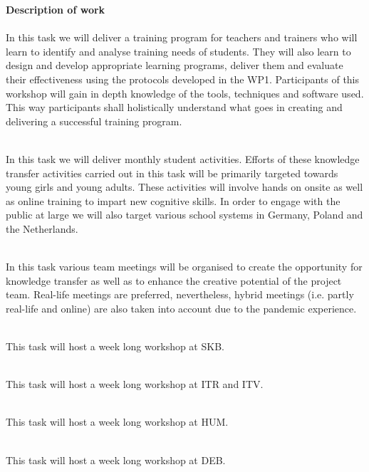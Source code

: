 \textbf{Description of work}\\
\\
In this task we will deliver a training program for teachers and trainers who will learn to identify and analyse training needs of students. They will also learn to design and develop appropriate learning programs, deliver them and evaluate their effectiveness using the protocols developed in the WP1. Participants of this workshop will gain in depth knowledge of the tools, techniques and software used. This way participants shall holistically understand what goes in creating and delivering a successful training program.

\\
In this task we will deliver monthly student activities. Efforts of these knowledge transfer activities carried out in this task will be primarily targeted towards young girls and young adults. These activities will involve hands on onsite as well as online training to impart new cognitive skills. In order to engage with the public at large we will also target various school systems in Germany, Poland and the Netherlands.

\\
In this task various team meetings will be organised to create the opportunity for knowledge transfer as well as to enhance the creative potential of the project team. Real-life meetings are preferred, nevertheless, hybrid meetings (i.e. partly real-life and online) are also taken into account due to the pandemic experience.

\\
This task will host a week long workshop at SKB.

\\
This task will host a week long workshop at ITR and ITV.

\\
This task will host a week long workshop at HUM.

\\
This task will host a week long workshop at DEB.



